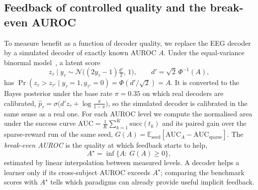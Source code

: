 \subsection{Feedback of controlled quality and the break-even AUROC}
\label{sec:binormal}
To measure benefit as a function of decoder quality, we replace the EEG decoder by a simulated decoder of
exactly known AUROC $A$. Under the equal-variance binormal model~\citep{green1966signal}, a latent score
\begin{equation}
z_\tau\mid y_\tau\sim\mathcal N\!\big((2y_\tau-1)\tfrac{d'}{2},\,1\big),\qquad d'=\sqrt2\,\Phi^{-1}(A),
\label{eq:binormal}
\end{equation}
has $\Pr(z_{\tau}>z_{\tau'}\mid y_\tau=1,y_{\tau'}=0)=\Phi(d'/\sqrt2)=A$. It is converted to the Bayes posterior
under the base rate $\pi=0.35$ on which real decoders are calibrated,
$\hat p_\tau=\sigma\!\big(d' z_\tau+\log\tfrac{\pi}{1-\pi}\big)$, so the simulated decoder is calibrated in the
same sense as a real one. For each AUROC level we compute the normalised area under the success curve
$\mathrm{AUC}=\frac1{K}\sum_{k=1}^{K}\mathrm{succ}(t_k)$ and its paired gain over the sparse-reward run of the
same seed, $G(A)=\mathbb E_{\text{seed}}[\mathrm{AUC}_A-\mathrm{AUC}_{\text{sparse}}]$. The \emph{break-even
AUROC} is the quality at which feedback starts to help,
\begin{equation}
A^\star=\inf\{A:\ G(A)\ge 0\},
\label{eq:breakeven}
\end{equation}
estimated by linear interpolation between measured levels. A decoder helps a learner only if its
cross-subject AUROC exceeds $A^\star$; comparing the benchmark scores with $A^\star$ tells which paradigms can
already provide useful implicit feedback.
